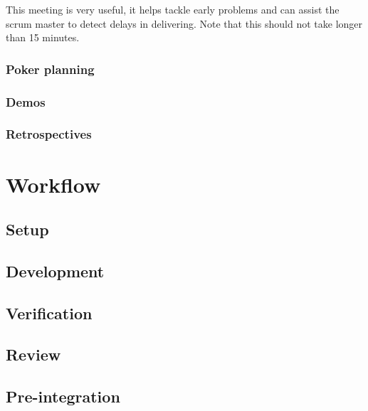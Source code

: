 This meeting is very useful, it helps tackle early problems and can assist the scrum master to detect delays in delivering.
Note that this should not take longer than 15 minutes.


\subsubsection{Poker planning}

\subsubsection{Demos}
\subsubsection{Retrospectives}

\section{Workflow}
\subsection{Setup}
\subsection{Development}
\subsection{Verification}
\subsection{Review}
\subsection{Pre-integration}
